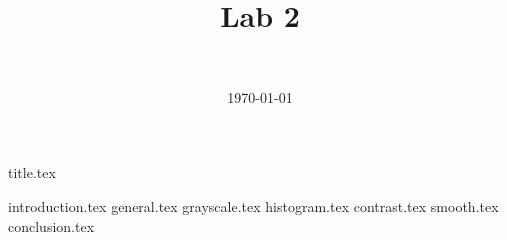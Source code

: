 \documentclass[final]{report} %
\title{Lab 2}
\author{~}
\date{\today}
\begin{document}

{title.tex}
\newpage
\tableofcontents

\newpage
{}
{introduction.tex}
{general.tex}
{grayscale.tex}
{histogram.tex}
{contrast.tex}
{smooth.tex}
{conclusion.tex}
\newpage
{}

\printbibliography
\end{document}
